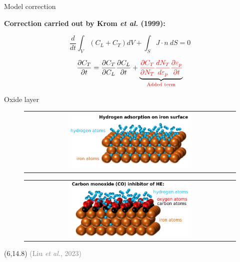 \documentclass[9pt]{beamer}
\begin{document}
\begin{frame}[noframenumbering]{Model correction}

    \textbf{Correction carried out by Krom \textit{et al.} (1999):}

    \vspace{0.3cm}

    \begin{equation*}
        {\frac{d}{dt} \int_V (C_L + C_T) dV + \int_S J \cdot n \ dS = 0}
    \end{equation*}

    \vspace{0.3cm}

    \begin{equation*}
        \frac{\partial C_T}{\partial t} = \frac{\partial C_T}{\partial C_L} \frac{\partial C_L}{\partial t} + \underbrace{\textcolor{red}{\frac{\partial C_T}{\partial N_T} \frac{d N_T}{d \varepsilon_p} \frac{\partial \varepsilon_p}{\partial t}}}_{\textcolor{red}{\textrm{{Added term}}}}
    \end{equation*}

\end{frame}


\begin{frame}[noframenumbering]{Oxide layer}

	\begin{figure}
        \begin{tabular}{c}
            \includegraphics[width=0.6\textwidth]{Images/adsoprtion.png}
        \end{tabular}
    \end{figure}
    
    \begin{figure}
        \begin{tabular}{c}
            \includegraphics[width=0.6\textwidth]{Images/oxide_surface.png}        		\end{tabular}
    \end{figure}
    
    \begin{textblock}{6}(6,14.8)
        \textcolor{gray}{\scriptsize (Liu \textit{et al.}, 2023)}
   	\end{textblock}

\end{frame}
\end{document}
